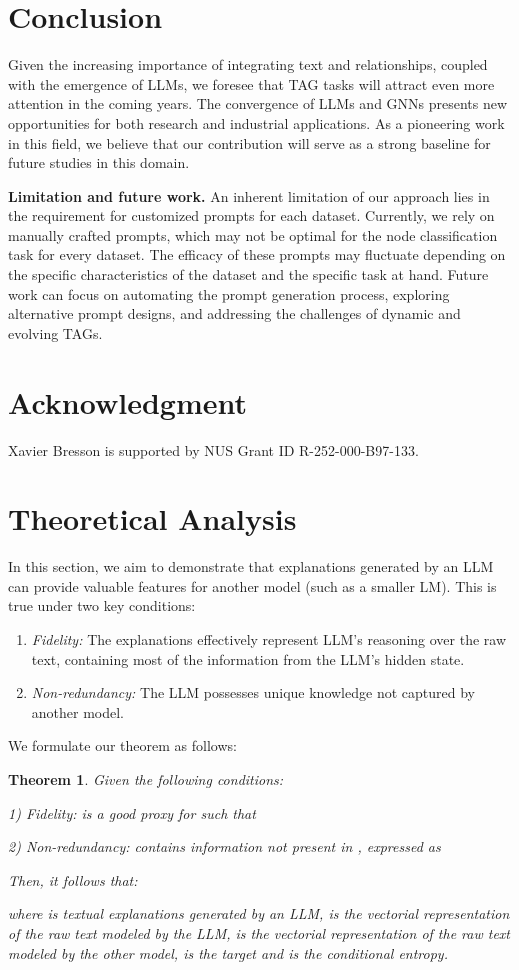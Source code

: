 \documentclass{article}
\newtheorem{theorem}{Theorem}
\begin{document}
\section{Conclusion}
Given the increasing importance of integrating text and relationships, coupled with the emergence of LLMs, we foresee that TAG tasks will attract even more attention in the coming years. The convergence of LLMs and GNNs presents new opportunities for both research and industrial applications. As a pioneering work in this field, we believe that our contribution will serve as a strong baseline for future studies in this domain.


\textbf{Limitation and future work.}
An inherent limitation of our approach lies in the requirement for customized prompts for each dataset. Currently, we rely on manually crafted prompts, which may not be optimal for the node classification task for every dataset. The efficacy of these prompts may fluctuate depending on the specific characteristics of the dataset and the specific task at hand.
Future work can focus on automating the prompt generation process, exploring alternative prompt designs, and addressing the challenges of dynamic and evolving TAGs.


\section*{Acknowledgment}
Xavier Bresson is supported by NUS Grant ID R-252-000-B97-133.

\printbibliography

\newpage
\appendix
\section{Theoretical Analysis}\label{theory}

In this section, we aim to demonstrate that explanations generated by an LLM can provide valuable features for another model (such as a smaller LM). This is true under two key conditions:
\begin{enumerate}
\item \emph{Fidelity:} The explanations effectively represent LLM's reasoning over the raw text, containing most of the information from the LLM's hidden state.
\item \emph{Non-redundancy:} The LLM possesses unique knowledge not captured by another model.
\end{enumerate}


We formulate our theorem as follows:
\begin{theorem}
Given the following conditions: 

1) Fidelity:  is a good proxy for  such that


2) Non-redundancy:  contains information not present in , expressed as



Then, it follows that:


where  is textual explanations generated by an LLM,  is the vectorial representation of the raw text modeled by the LLM,  is the vectorial representation of the raw text modeled by the other model,  is the target and  is the conditional entropy.
\end{theorem}
\end{document}
